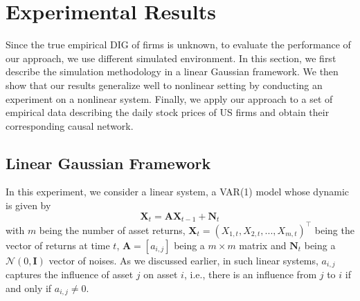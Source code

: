  
 
\section{Experimental Results}\label{sec:exp}

 Since the true empirical DIG of firms is unknown, to evaluate the performance of our approach, we use different simulated environment.
 In this section, we first describe the simulation methodology in a linear Gaussian framework. 
 We then show that our results generalize well to nonlinear setting by conducting an experiment on a nonlinear system. 
 Finally, we apply our approach to a set of empirical data describing the daily stock prices of US firms and obtain their corresponding causal network. 
 
 \subsection{Linear Gaussian Framework} \label{linfr}
 In this experiment, we consider a linear system, a VAR(1) model whose dynamic is given by 
\begin{equation}\label{eq:ex_lin}
    \textbf{X}_t = \textbf{A} \textbf{X}_{t-1} + \textbf{N}_t
\end{equation}
with $m$ being the number of asset returns, $\textbf{X}_t = (X_{1,t}, X_{2,t}, ... , X_{m,t})^\top$ being the vector of returns at time $t$, $\textbf{A}=[a_{i,j}]$ being a $m\times m$ matrix and $\textbf{N}_t$ being a $\mathcal{N}(0,\textbf{I})$ vector of noises. 
As we discussed earlier, in such linear systems, $a_{i,j}$ captures the influence of asset $j$ on asset $i$, i.e., there is an influence from $j$ to $i$ if and only if $a_{i,j}\neq0$.



